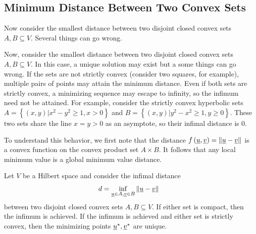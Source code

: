 \subsection{Minimum Distance Between Two Convex Sets}

Now consider the smallest distance between two disjoint closed convex sets $A,B\subseteq V$.  Several things can go wrong.

Now, consider the smallest distance between two disjoint closed convex sets $A,B\subseteq V$.
In this case, a unique solution may exist but a some things can go wrong.
If the sets are not strictly convex (consider two squares, for example), multiple pairs of points may attain the minimum distance.
Even if both sets are strictly convex, a minimizing sequence may escape to infinity, so the infimum need not be attained.
For example, consider the strictly convex hyperbolic sets $A=\left\{ (x,y)|x^{2}-y^{2}\geq1,x>0\right\} $ and $B=\left\{ (x,y)|y^{2}-x^{2}\geq1,y\geq0\right\} $. These two sets share the line $x=y>0$ as an asymptote, so their infimal distance is 0.

To understand this behavior, we first note that the distance $f\left(\underline u,\underline v\right)=\left\Vert \underline u-\underline v\right\Vert $ is a convex function on the convex product set $A\times B$.
It follows that any local minimum value is a global minimum value distance.
\begin{theorem}
\label{thm:MinDistTwoConvexSet} Let $V$ be a Hilbert space and consider the infimal distance
\[
d=\inf_{\underline u\in A,\underline v\in B}\left\Vert \underline u-\underline v\right\Vert 
\]
between two disjoint closed convex sets $A,B\subseteq V$.
If either set is compact, then the infimum is achieved.
If the infimum is achieved and either set is strictly convex, then the minimizing points $\underline u^{*},\underline v^{*}$ are unique.
\end{theorem}

